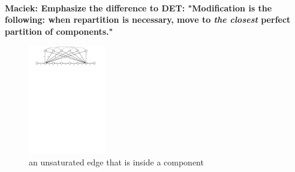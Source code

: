 \documentclass[manuscript,screen=true, review, anonymous]{acmart}
\newcommand\maciek[1]{\color{brown}\textbf{\\ Maciek: #1}\color{black}}
\begin{document}
\maciek{Emphasize the difference to DET: "Modification is the following: when repartition is necessary, move to \emph{the closest} perfect partition of components."}




\begin{figure}[H]
	\centering
	\includegraphics[width=0.3\textwidth]{figs/substitute}
	\caption{an unsaturated edge that is inside a component}
\end{figure}
\end{document}
